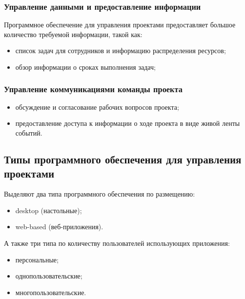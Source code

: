 \documentclass[a4paper, 14pt]{extarticle}
\begin{document}
\subsubsection{Управление данными и предоставление информации}
Программное обеспечение для управления проектами предоставляет большое количество
требуемой информации, такой как:
\begin{itemize}
  \item список задач для сотрудников и информацию распределения ресурсов;
  \item обзор информации о сроках выполнения задач;
\end{itemize}

\subsubsection{Управление коммуникациями команды проекта}
\begin{itemize}
  \item обсуждение и согласование рабочих вопросов проекта;
  \item предоставление доступа к информации о ходе проекта в виде живой ленты событий.
\end{itemize}

\subsection{Типы программного обеспечения для управления проектами}
Выделяют два типа программного обеспечения по размещению:
\begin{itemize}
  \item desktop (настольные);
  \item web-based (веб-приложения).
\end{itemize}

А также три типа по количеству пользователей использующих приложения:
\begin{itemize}
  \item персональные;
  \item однопользовательские;
  \item многопользовательские.
\end{itemize}
\end{document}
